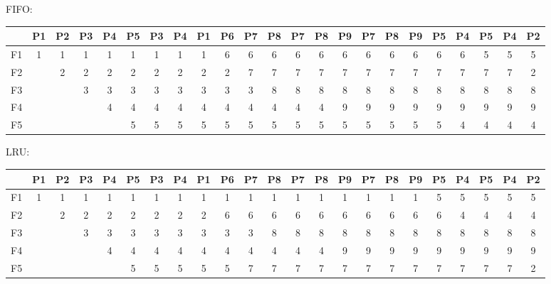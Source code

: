 \begin{latin}
    FIFO:
    {
    \scriptsize
    \center
    \begin{tabular}{c|c|c|c|c|c|c|c|c|c|c|c|c|c|c|c|c|c|c|c|c|c|c}
        & P1 & P2 & P3 & P4 & P5 & P3 & P4 & P1 & P6 & P7 & P8 & P7 & P8 & P9 & P7 & P8 & P9 & P5 & P4 & P5 & P4 & P2\\
        \hline
        F1 & 1 & 1 & 1 & 1 & 1 & 1 & 1 & 1 & 6 & 6 & 6 & 6 & 6 & 6 & 6 & 6 & 6 & 6 & 6 & 5 & 5 & 5\\
        F2 &   & 2 & 2 & 2 & 2 & 2 & 2 & 2 & 2 & 7 & 7 & 7 & 7 & 7 & 7 & 7 & 7 & 7 & 7 & 7 & 7 & 2\\
        F3 &   &   & 3 & 3 & 3 & 3 & 3 & 3 & 3 & 3 & 8 & 8 & 8 & 8 & 8 & 8 & 8 & 8 & 8 & 8 & 8 & 8\\
        F4 &   &   &   & 4 & 4 & 4 & 4 & 4 & 4 & 4 & 4 & 4 & 4 & 9 & 9 & 9 & 9 & 9 & 9 & 9 & 9 & 9\\
        F5 &   &   &   &   & 5 & 5 & 5 & 5 & 5 & 5 & 5 & 5 & 5 & 5 & 5 & 5 & 5 & 5 & 4 & 4 & 4 & 4
    \end{tabular}
    }
    LRU:
    {
    \scriptsize
    \center
    \begin{tabular}{c|c|c|c|c|c|c|c|c|c|c|c|c|c|c|c|c|c|c|c|c|c|c}
        & P1 & P2 & P3 & P4 & P5 & P3 & P4 & P1 & P6 & P7 & P8 & P7 & P8 & P9 & P7 & P8 & P9 & P5 & P4 & P5 & P4 & P2\\
        \hline
        F1 & 1 & 1 & 1 & 1 & 1 & 1 & 1 & 1 & 1 & 1 & 1 & 1 & 1 & 1 & 1 & 1 & 1 & 5 & 5 & 5 & 5 & 5 \\
        F2 &   & 2 & 2 & 2 & 2 & 2 & 2 & 2 & 6 & 6 & 6 & 6 & 6 & 6 & 6 & 6 & 6 & 6 & 4 & 4 & 4 & 4 \\
        F3 &   &   & 3 & 3 & 3 & 3 & 3 & 3 & 3 & 3 & 8 & 8 & 8 & 8 & 8 & 8 & 8 & 8 & 8 & 8 & 8 & 8 \\
        F4 &   &   &   & 4 & 4 & 4 & 4 & 4 & 4 & 4 & 4 & 4 & 4 & 9 & 9 & 9 & 9 & 9 & 9 & 9 & 9 & 9 \\
        F5 &   &   &   &   & 5 & 5 & 5 & 5 & 5 & 7 & 7 & 7 & 7 & 7 & 7 & 7 & 7 & 7 & 7 & 7 & 7 & 2 
    \end{tabular}
    }
\end{latin}